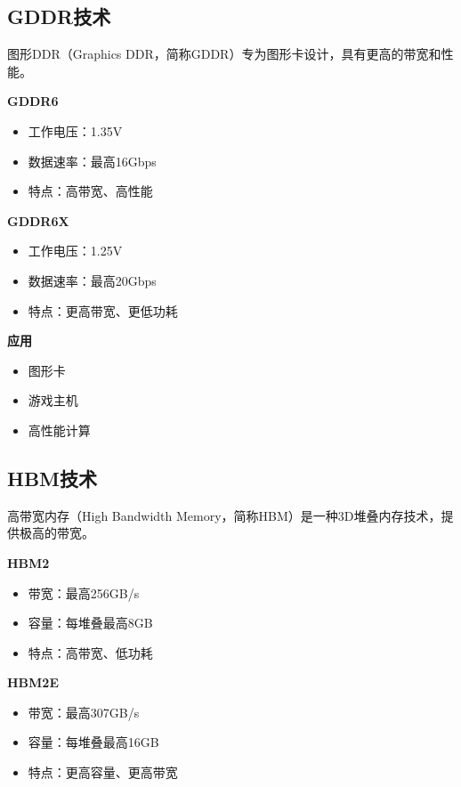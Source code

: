 \documentclass{article}
\begin{document}
\subsection{GDDR技术}

图形DDR（Graphics DDR，简称GDDR）专为图形卡设计，具有更高的带宽和性能。

\textbf{GDDR6}

\begin{itemize}
    \item 工作电压：1.35V
    \item 数据速率：最高16Gbps
    \item 特点：高带宽、高性能
\end{itemize}

\textbf{GDDR6X}

\begin{itemize}
    \item 工作电压：1.25V
    \item 数据速率：最高20Gbps
    \item 特点：更高带宽、更低功耗
\end{itemize}

\textbf{应用}
\begin{itemize}
    \item 图形卡
    \item 游戏主机
    \item 高性能计算
\end{itemize}

\subsection{HBM技术}

高带宽内存（High Bandwidth Memory，简称HBM）是一种3D堆叠内存技术，提供极高的带宽。

\textbf{HBM2}

\begin{itemize}
    \item 带宽：最高256GB/s
    \item 容量：每堆叠最高8GB
    \item 特点：高带宽、低功耗
\end{itemize}

\textbf{HBM2E}

\begin{itemize}
    \item 带宽：最高307GB/s
    \item 容量：每堆叠最高16GB
    \item 特点：更高容量、更高带宽
\end{itemize}
\end{document}
